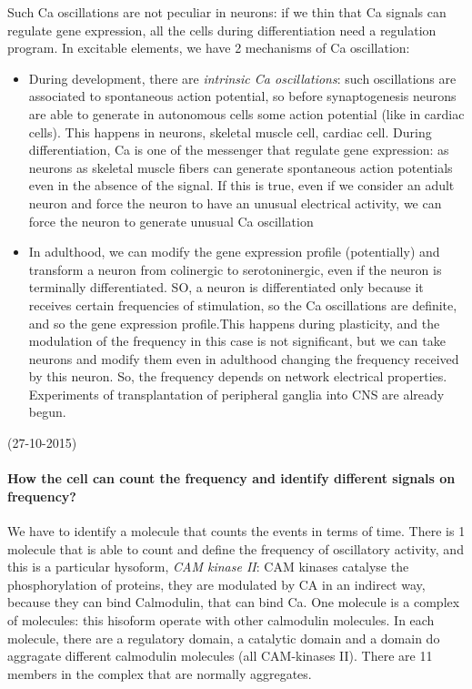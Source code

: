 \documentclass[a4paper, 12pt]{book}
\begin{document}
Such Ca oscillations are not peculiar in neurons: if we thin that Ca signals can regulate gene expression, all the cells during differentiation need a regulation program. In excitable elements, we have 2 mechanisms of Ca oscillation:
\begin{itemize}
\item{During development, there are \emph{intrinsic Ca oscillations}: such oscillations are associated to spontaneous action potential, so before synaptogenesis neurons are able to generate in autonomous cells some action potential (like in cardiac cells). This happens in neurons, skeletal muscle cell, cardiac cell. During differentiation, Ca is one of the messenger that regulate gene expression: as neurons as skeletal muscle fibers can generate spontaneous action potentials even in the absence of the signal. If this is true, even if we consider an adult neuron and force the neuron to have an unusual electrical activity, we can force the neuron to generate unusual Ca oscillation}
\item{In adulthood, we can modify the gene expression profile (potentially) and transform a neuron from colinergic to serotoninergic, even if the neuron is terminally differentiated. SO, a neuron is differentiated only because it receives certain frequencies of stimulation, so the Ca oscillations are definite, and so the gene expression profile.This  happens during plasticity, and the modulation of the frequency in this case is not significant, but we can take neurons and modify them even in adulthood changing the frequency received by this neuron.  So, the frequency depends on network electrical properties. Experiments of transplantation of peripheral ganglia into CNS are already begun.}
\end{itemize}

(27-10-2015)

\paragraph{How the cell can count the frequency and identify different signals on frequency?}  We have to identify a molecule that counts the events in terms of time. There is 1 molecule that is able to count and define the frequency of oscillatory activity, and this is a particular hysoform, \emph{CAM kinase II}: CAM kinases catalyse the phosphorylation of proteins, they are modulated by CA in an indirect way, because they can bind Calmodulin, that can bind Ca.  One molecule is a complex of molecules: this hisoform operate with other calmodulin molecules. In each molecule, there are a regulatory domain, a catalytic domain and a domain do aggragate different calmodulin molecules (all CAM-kinases II). There are 11 members in the complex that are normally aggregates.
\end{document}
